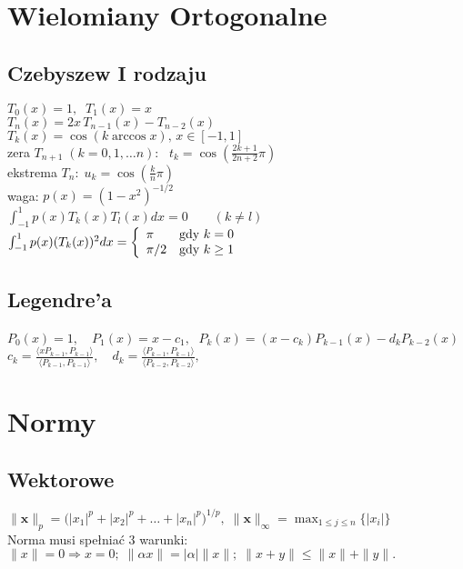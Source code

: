 \documentclass[a4paper,twocolumn]{article}
\begin{document}
\section{Wielomiany Ortogonalne}

\subsection{Czebyszew I rodzaju}
$T_0(x) = 1,\;\;T_1(x) = x$\\
$T_n(x) = 2x\,T_{n-1}(x) - T_{n-2}(x)$\\
$T_{k}(x) = \cos(k\arccos x),\,x\in [-1,1]$\\
zera $T_{n+1}\;(k=0,1,\ldots n)$: \, $t_k=\cos\left(\frac{2k+1}{2n+2}\pi\right)$\\
ekstrema $T_{n}:\; u_k = \cos\left(\frac{k}{n}\pi\right)$\\
waga: $p(x) = (1-x^2)^{-1/2}$\\
$ \int_{-1}^{1} p(x)T_k(x)T_l(x) dx = 0 \qquad (k \neq l) $\\
$  \int_{-1}^{1} p(x)(T_k(x))^2 dx = \left\{ \begin{array}{ll}
\pi & \textrm{gdy $k=0$}\\
\pi/2 & \textrm{gdy $ k \geq 1 $}
\end{array} \right.$
\subsection{Legendre'a}
$P_0(x) = 1, \quad P_1(x) = x-c_1,\;$
 $   P_k(x) = (x-c_k)P_{k-1}(x) - d_k P_{k-2}(x) $\\
$
    c_k = \frac{\langle x P_{k-1}, P_{k-1} \rangle}{\langle P_{k-1}, P_{k-1} \rangle}, \quad
    d_k = \frac{\langle P_{k-1}, P_{k-1} \rangle}{\langle P_{k-2}, P_{k-2} \rangle},
$
\section{Normy}
\subsection{Wektorowe}
${\displaystyle \|\mathbf {x} \|_{p}={\bigl (}|x_{1}|^{p}+|x_{2}|^{p}+\ldots +|x_{n}|^{p}{\bigr )}^{1/p},\;\|\mathbf {x} \|_{\infty }=\max_{1 \leq j \leq n} {\bigl \{}|x_{i}| {\bigr \}}}$ \\
Norma musi spełniać 3 warunki:\\
${\displaystyle \|x\|=0\Rightarrow x=0;\; \|\alpha x\|=|\alpha |\|x\|;\;  \|x+y\|\leqslant \|x\|+\|y\|.}$
\end{document}
